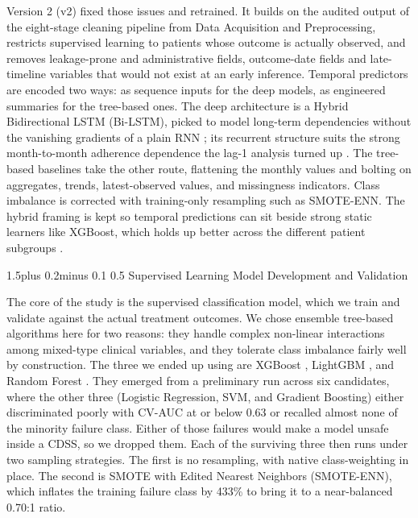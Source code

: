 \documentclass[12pt]{article}
\makeatletter
\renewcommand{\_}{\textunderscore\allowbreak}
\renewcommand{\subsection}{\@startsection{subsection}{2}{0pt}%
  {1.5\baselineskip plus 0.2\baselineskip minus 0.1\baselineskip}%
  {0.5\baselineskip}%
  {\bfseries\normalsize}}
\makeatother
\begin{document}
Version 2 (v2) fixed those issues and retrained. It builds on the audited output of the eight-stage cleaning pipeline from Data Acquisition and Preprocessing, restricts supervised learning to patients whose outcome is actually observed, and removes leakage-prone and administrative fields, outcome-date fields and late-timeline variables that would not exist at an early inference. Temporal predictors are encoded two ways: as sequence inputs for the deep models, as engineered summaries for the tree-based ones. The deep architecture is a Hybrid Bidirectional LSTM (Bi-LSTM), picked to model long-term dependencies without the vanishing gradients of a plain RNN \citep{ref11}; its recurrent structure suits the strong month-to-month adherence dependence the lag-1 analysis turned up \citep{ref12}. The tree-based baselines take the other route, flattening the monthly values and bolting on aggregates, trends, latest-observed values, and missingness indicators. Class imbalance is corrected with training-only resampling such as SMOTE-ENN. The hybrid framing is kept so temporal predictions can sit beside strong static learners like XGBoost, which holds up better across the different patient subgroups \citep{ref10}.

\subsection{Supervised Learning Model Development and Validation}

The core of the study is the supervised classification model, which we train and validate against the actual treatment outcomes. We chose ensemble tree-based algorithms here for two reasons: they handle complex non-linear interactions among mixed-type clinical variables, and they tolerate class imbalance fairly well by construction. The three we ended up using are XGBoost \citep{chen2016xgboost,ref16}, LightGBM \citep{ke2017lightgbm}, and Random Forest \citep{breiman2001random}. They emerged from a preliminary run across six candidates, where the other three (Logistic Regression, SVM, and Gradient Boosting) either discriminated poorly with CV-AUC at or below 0.63 or recalled almost none of the minority failure class. Either of those failures would make a model unsafe inside a CDSS, so we dropped them. Each of the surviving three then runs under two sampling strategies. The first is no resampling, with native class-weighting in place. The second is SMOTE with Edited Nearest Neighbors (SMOTE-ENN), which inflates the training failure class by 433\% to bring it to a near-balanced 0.70:1 ratio.
\end{document}
